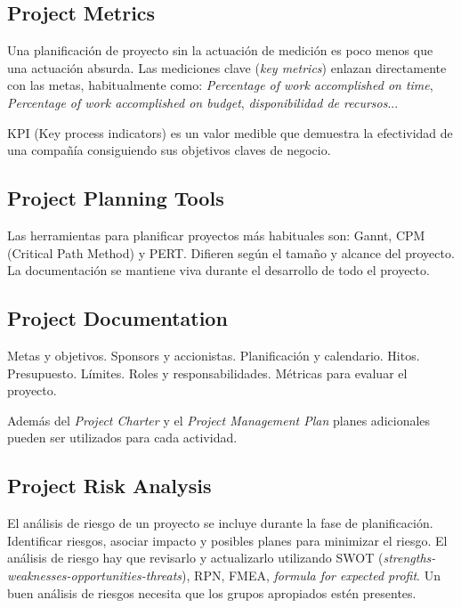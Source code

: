 \documentclass[]{article}
\begin{document}
\subsection{Project Metrics}

Una planificación de proyecto sin la actuación de medición es poco menos que una actuación absurda. Las mediciones clave (\textit{key metrics}) enlazan directamente con las metas, habitualmente como: \textit{Percentage of work accomplished on time}, \textit{Percentage of work accomplished on budget}, \textit{disponibilidad de recursos}...

KPI (Key process indicators) es un valor medible que demuestra la efectividad de una compañía consiguiendo sus objetivos claves de negocio.

\subsection{Project Planning Tools}

Las herramientas para planificar proyectos más habituales son: Gannt, CPM (Critical Path Method) y PERT. Difieren según el tamaño y alcance del proyecto. La documentación se mantiene viva durante el desarrollo de todo el proyecto.

\subsection{Project Documentation}

Metas y objetivos. Sponsors y accionistas. Planificación y calendario. Hitos. Presupuesto. Límites. Roles y responsabilidades. Métricas para evaluar el proyecto.

Además del \textit{Project Charter} y el \textit{Project Management Plan} planes adicionales pueden ser utilizados para cada actividad.

\subsection{Project Risk Analysis}

El análisis de riesgo de un proyecto se incluye durante la fase de planificación. Identificar riesgos, asociar impacto y posibles planes para minimizar el riesgo. El análisis de riesgo hay que revisarlo y actualizarlo utilizando SWOT (\textit{strengths-weaknesses-opportunities-threats}), RPN, FMEA, \textit{formula for expected profit}.
Un buen análisis de riesgos necesita que los grupos apropiados estén presentes.
\end{document}
